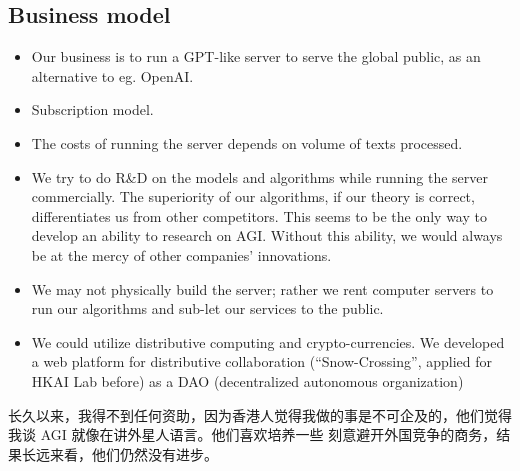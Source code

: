 \begin{preview}
	\begin{minipage}{\textwidth}
		\setlength{\parskip}{0.4\baselineskip}
		

\subsection{Business model}

\begin{itemize}
	\item Our business is to run a GPT-like server to serve the global public, as an alternative to eg. OpenAI.
	
	\item Subscription model.
	
	\item The costs of running the server depends on volume of texts processed.
	
	\item We try to do R\&D on the models and algorithms while running the server commercially.  The superiority of our algorithms, if our theory is correct, differentiates us from other competitors.  This seems to be the only way to develop an ability to research on AGI.  Without this ability, we would always be at the mercy of other companies' innovations.
	
	\item We may not physically build the server; rather we rent computer servers to run our algorithms and sub-let our services to the public.
	
	\item We could utilize distributive computing and crypto-currencies.  We developed a web platform for distributive collaboration (``Snow-Crossing'', applied for HKAI Lab before) as a DAO (decentralized autonomous organization)

\end{itemize}

长久以来，我得不到任何资助，因为香港人觉得我做的事是不可企及的，他们觉得我谈 AGI 就像在讲外星人语言。他们喜欢培养一些 刻意避开外国竞争的商务，结果长远来看，他们仍然没有进步。\\


\end{minipage}
\end{preview}
